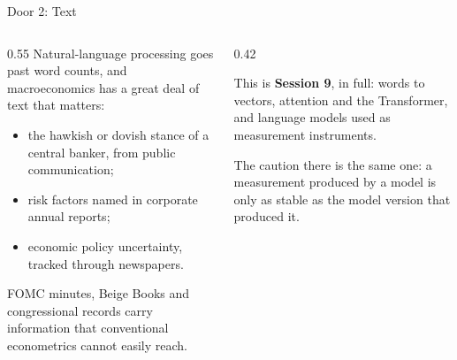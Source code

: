 \begin{frame}{Door 2: Text}
\begin{columns}[T]
\begin{column}{0.55\textwidth}
\small
Natural-language processing goes past word counts, and macroeconomics has a great deal of text that matters:
\medskip

\begin{itemize}\small\setlength{\itemsep}{1.2mm}
  \item the hawkish or dovish stance of a central banker, from public communication;
  \item risk factors named in corporate annual reports;
  \item economic policy uncertainty, tracked through newspapers.
\end{itemize}
\medskip

FOMC minutes, Beige Books and congressional records carry information that conventional econometrics cannot easily reach.
\end{column}
\begin{column}{0.42\textwidth}
\begin{takeawaybox}\footnotesize
This is \textbf{Session 9}, in full: words to vectors, attention and the Transformer, and language models used as measurement instruments.
\end{takeawaybox}
\medskip
\begin{cautionbox}\footnotesize
The caution there is the same one: a measurement produced by a model is only as stable as the model version that produced it.
\end{cautionbox}
\end{column}
\end{columns}
\end{frame}

